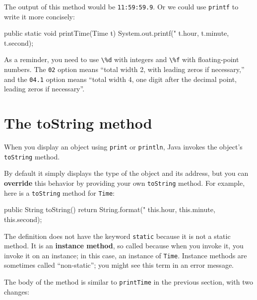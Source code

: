 \documentclass[12pt]{book}
\theoremstyle{exercise}
\newcommand{\java}[1]{\verb"#1"}
\begin{document}
The output of this method would be {\tt 11:59:59.9}.
Or we could use \java{printf} to write it more concisely:


\begin{code}
    public static void printTime(Time t) {
        System.out.printf("%
            t.hour, t.minute, t.second);
    }
\end{code}

As a reminder, you need to use \java{\%d} with integers and \java{\%f} with floating-point numbers.
The \java{02} option means ``total width 2, with leading zeros if necessary,'' and the \java{04.1} option means ``total width 4, one digit after the decimal point, leading zeros if necessary''.


\section{The toString method}


When you display an object using \java{print} or \java{println}, Java invokes the object's \java{toString} method.


By default it simply displays the type of the object and its address, but you can {\bf override} this behavior by providing your own \java{toString} method.
For example, here is a \java{toString} method for \java{Time}:

\begin{code}
    public String toString() {
        return String.format("%
                             this.hour, this.minute, this.second);
    }
\end{code}

The definition does not have the keyword \java{static} because it is not a static method.
It is an {\bf instance method}, so called because when you invoke it, you invoke it on an instance; in this case, an instance of \java{Time}.
Instance methods are sometimes called ``non-static''; you might see this term in an error message.


The body of the method is similar to \java{printTime} in the previous section, with two changes:
\end{document}
